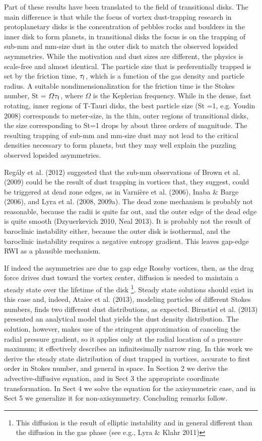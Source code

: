 \documentclass[apj]{emulateapj}
\begin{document}
Part of these results have been translated to the field of
transitional disks. The main difference is that while the focus 
of vortex dust-trapping research in protoplanetary disks is the
concentration of pebbles rocks and boulders in the inner disk to form
planets, in transitional disks the focus is on the trapping of sub-mm
and mm-size dust in the outer disk to match the observed lopsided 
asymmetries. While the motivation and dust sizes are different, the
physics is scale-free and almost identical. The particle size that is
preferentially trapped is set by the friction time, $\tau_{\rm f}$, which is a
function of the gas density and particle radius. A suitable nondimensionalization for the
friction time is the Stokes number, St = $\varOmega \tau_{\rm f}$,
where $\varOmega$ is the Keplerian frequency. While in the dense, fast
rotating, inner regions of T-Tauri disks, the best particle size (St =1, e.g. Youdin 2008)
corresponds to meter-size, in the thin, outer regions of transitional
disks, the size corresponding to St=1 drops by about three orders of
magnitude. The resulting trapping of sub-mm and mm-size dust may not
lead to the critical densities necessary to form planets, but they may
well explain the puzzling observed lopsided asymmetries. 

Reg\'aly et al. (2012) suggested that the sub-mm 
observations of Brown et al. (2009) could be the result of dust
trapping in vortices that, they suggest, could be triggered at dead
zone edges, as in Varni\`ere et al. (2006), Inaba \& Barge (2006), and Lyra et
al. (2008, 2009a). The dead zone mechanism is probably not reasonable,
because the radii is quite far out, and the outer edge of the dead
edge is quite smooth (Dzyuerkevich 2010, Neal 2013). It is probably
not the result of baroclinic instability either, because the outer
disk is isothermal, and the baroclinic instability requires a negative
entropy gradient. This leaves gap-edge RWI as a plausible mechanism. 

If indeed the asymmetries are due to gap edge Rossby vortices, then, 
as the drag force drives dust toward the vortex center, diffusion is
needed to maintain a steady state over the lifetime of the disk \footnote{{This
diffusion is the result of elliptic instability and in general
different than the diffusion in the gas phase (see e.g., Lyra \& Klahr
2011)}}. Steady state solutions should exist in this case and, indeed, Ataiee
et al. (2013), modeling particles of different Stokes numbers, finds
two different dust distributions, as expected. Birnstiel et al. (2013) 
presented an analytical model that yields the dust density
distribution. The solution, however, makes use of the stringent
approximation of canceling the radial pressure gradient, so it applies
only at the radial location of a pressure maximum; it effectively
describes an infinitesimally narrow ring.  In this work we derive the 
steady state distribution of dust trapped in vortices, accurate to first order in
Stokes number, and general in space. In Section 2 we derive the
advective-diffusive equation, and in Sect 3 the appropriate coordinate
transformation. In Sect 4 we solve the equation for the axisymmetric
case, and in Sect 5 we generalize it for non-axisymmetry. Concluding
remarks follow. 
\end{document}
